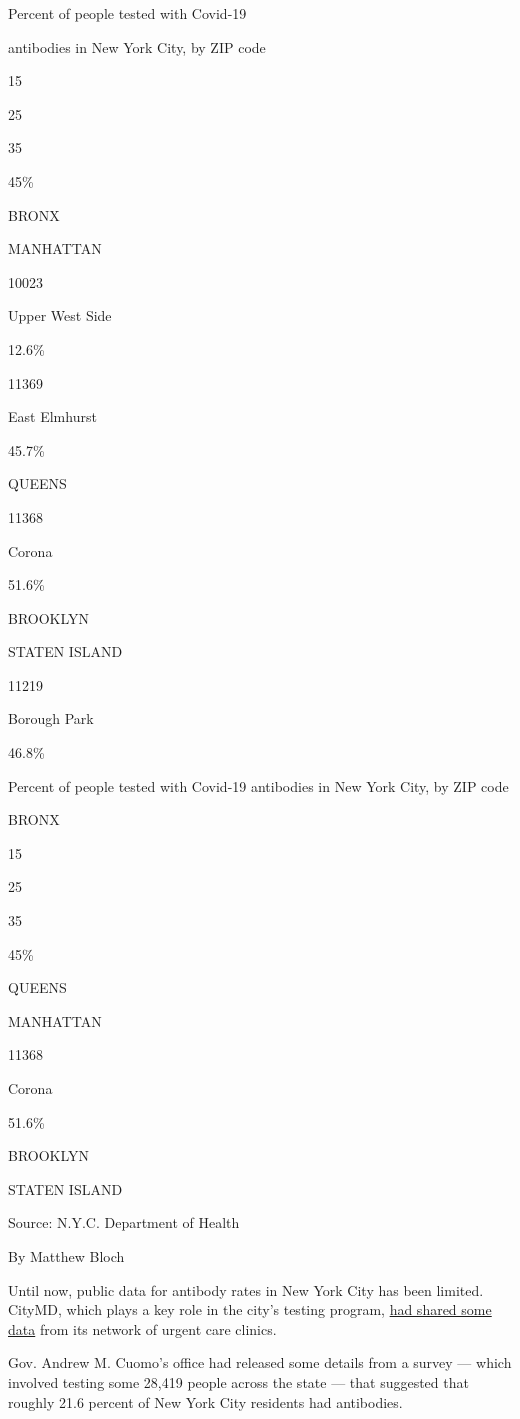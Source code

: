 Percent of people tested with Covid-19

antibodies in New York City, by ZIP code

15

25

35

45\%

BRONX

MANHATTAN

10023

Upper West Side

12.6\%

11369

East Elmhurst

45.7\%

QUEENS

11368

Corona

51.6\%

BROOKLYN

STATEN ISLAND

11219

Borough Park

46.8\%

Percent of people tested with Covid-19 antibodies in New York City, by
ZIP code

BRONX

15

25

35

45\%

QUEENS

MANHATTAN

11368

Corona

51.6\%

BROOKLYN

STATEN ISLAND

Source: N.Y.C. Department of Health

By Matthew Bloch

Until now, public data for antibody rates in New York City has been
limited. CityMD, which plays a key role in the city's testing program,
\href{https://www.nytimes3xbfgragh.onion/2020/07/09/nyregion/nyc-coronavirus-antibodies.html}{had
shared some data} from its network of urgent care clinics.

Gov. Andrew M. Cuomo's office had released some details from a survey
--- which involved testing some 28,419 people across the state --- that
suggested that roughly 21.6 percent of New York City residents had
antibodies.

